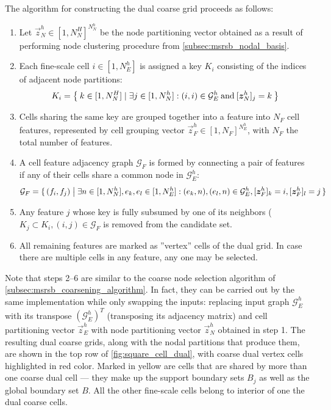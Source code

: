 The algorithm for constructing the dual coarse grid proceeds as follows:
\begin{enumerate}
    \item Let $\vec{z}_N^h \in [1,N_N^H]^{N_N^h}$ be the node partitioning vector obtained as a result of performing node clustering procedure from \cref{subsec:msrsb_nodal_basis}.
    \item Each fine-scale cell $i \in [1,N_E^h]$ is assigned a key $K_i$ consisting of the indices of adjacent node partitions:
    \begin{align}
        K_i = \Set{ k \in [1,N_N^H] \mid \exists j \in [1,N_N^h]: (i,i) \in \mathcal{G}_E^h \:\text{and}\: [\bm{z}_N^h]_j = k }
    \end{align}
    \item Cells sharing the same key are grouped together into a feature into $N_F$ cell features, represented by cell grouping vector $\vec{z}_F^h \in [1,N_F]^{N_E^h}$, with $N_F$ the total number of features.
    \item A cell feature adjacency graph $\mathcal{G}_F$ is formed by connecting a pair of features if any of their cells share a common node in $\mathcal{G}_E^h$:
    \begin{align}
        \mathcal{G}_F = \set{(f_i,f_j) \bigm| \exists n \in [1,N_N^h], e_k, e_l \in [1,N_E^h]: (e_k,n), (e_l,n) \in \mathcal{G}_E^h, [\bm{z}_F^h]_k = i, [\bm{z}_F^h]_l = j}
    \end{align}
    \item Any feature $j$ whose key is fully subsumed by one of its neighbors ($K_j \subset K_i, (i,j) \in \mathcal{G}_F$ is removed from the candidate set.
    \item All remaining features are marked as ''vertex'' cells of the dual grid.   In case there are multiple cells in any feature, any one may be selected.
\end{enumerate}
Note that steps 2--6 are similar to the coarse node selection algorithm of \cref{subsec:msrsb_coarsening_algorithm}.   In fact, they can be carried out by the same implementation while only swapping the inputs: replacing input graph $\mathcal{G}_{E}^h$ with its transpose $(\mathcal{G}_{E}^h)^T$ (transposing its adjacency matrix) and cell partitioning vector $\vec{z}_E^h$ with node partitioning vector $\vec{z}_N^h$ obtained in step 1.   The resulting dual coarse grids, along with the nodal partitions that produce them, are shown in the top row of \cref{fig:square_cell_dual}, with coarse dual vertex cells highlighted in red color.   Marked in yellow are cells that are shared by more than one coarse dual cell --- they make up the support boundary sets $B_j$ as well as the global boundary set $B$.   All the other fine-scale cells belong to interior of one the dual coarse cells.

